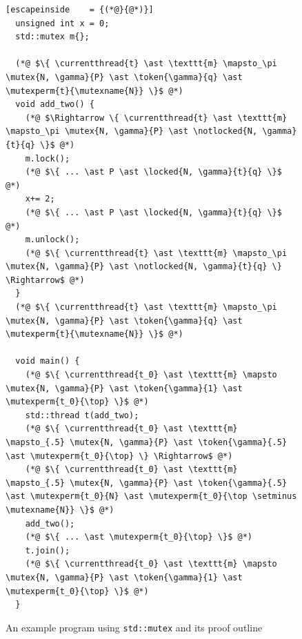 \begin{figure}[htb]
\begin{lstlisting}[escapeinside    = {(*@}{@*)}]
  unsigned int x = 0;
  std::mutex m{};

  (*@ $\{ \currentthread{t} \ast \texttt{m} \mapsto_\pi \mutex{N, \gamma}{P} \ast \token{\gamma}{q} \ast \mutexperm{t}{\mutexname{N}} \}$ @*)
  void add_two() {
    (*@ $\Rightarrow \{ \currentthread{t} \ast \texttt{m} \mapsto_\pi \mutex{N, \gamma}{P} \ast \notlocked{N, \gamma}{t}{q} \}$ @*)
    m.lock();
    (*@ $\{ ... \ast P \ast \locked{N, \gamma}{t}{q} \}$ @*)
    x+= 2;
    (*@ $\{ ... \ast P \ast \locked{N, \gamma}{t}{q} \}$ @*)
    m.unlock();
    (*@ $\{ \currentthread{t} \ast \texttt{m} \mapsto_\pi \mutex{N, \gamma}{P} \ast \notlocked{N, \gamma}{t}{q} \} \Rightarrow$ @*)
  }
  (*@ $\{ \currentthread{t} \ast \texttt{m} \mapsto_\pi \mutex{N, \gamma}{P} \ast \token{\gamma}{q} \ast \mutexperm{t}{\mutexname{N}} \}$ @*)

  void main() {
    (*@ $\{ \currentthread{t_0} \ast \texttt{m} \mapsto \mutex{N, \gamma}{P} \ast \token{\gamma}{1} \ast \mutexperm{t_0}{\top} \}$ @*)
    std::thread t(add_two);
    (*@ $\{ \currentthread{t_0} \ast \texttt{m} \mapsto_{.5} \mutex{N, \gamma}{P} \ast \token{\gamma}{.5} \ast \mutexperm{t_0}{\top} \} \Rightarrow$ @*)
    (*@ $\{ \currentthread{t_0} \ast \texttt{m} \mapsto_{.5} \mutex{N, \gamma}{P} \ast \token{\gamma}{.5} \ast \mutexperm{t_0}{N} \ast \mutexperm{t_0}{\top \setminus \mutexname{N}} \}$ @*)
    add_two();
    (*@ $\{ ... \ast \mutexperm{t_0}{\top} \}$ @*)
    t.join();
    (*@ $\{ \currentthread{t_0} \ast \texttt{m} \mapsto \mutex{N, \gamma}{P} \ast \token{\gamma}{1} \ast \mutexperm{t_0}{\top} \}$ @*)
  }
\end{lstlisting}
\caption{An example program using \lstinline{std::mutex} and its proof outline}
\label{mutex-ex-proof}
\end{figure}

